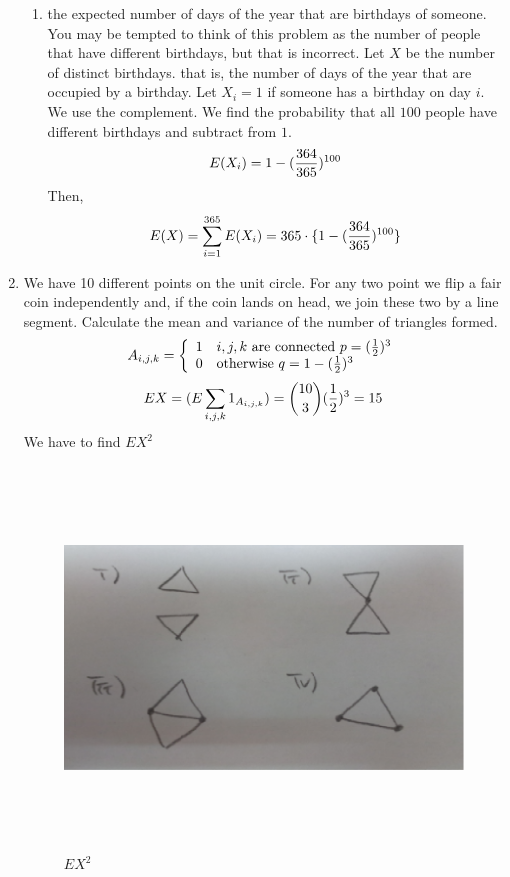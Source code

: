 \documentclass[12pt]{article}%
\newcommand{\0}{{\bf 0}}
\begin{document}
\begin{enumerate}
\begin{enumerate}
\item the expected number of days of the year that
are birthdays of someone.
\\
{\color{blue}{\bf Sol.}}
You may be tempted to think of this problem as the number of people that have different
 birthdays, but that is incorrect. Let $X$ be the number of distinct birthdays. that is, the number of days of the year that are occupied by a birthday. Let $X_i = 1$ if someone
 has a birthday on day $i$. We use the complement. We find the probability that all $100$ people have different birthdays and subtract from $1$.
$$E(X_i)=1-(\f{364}{365})^{100}$$
Then,
$$E(X)=\sum_{i=1}^{365} E(X_i)=365\cdot \{1-(\f{364}{365})^{100} \}$$

\end{enumerate}
 
 




\item
We have 10 different points on the unit circle.
For any two point
we flip a fair coin independently and,
if the coin lands on head, we join these two by a line segment.
Calculate the mean and variance of the number of triangles formed. 
\\
{\color{blue}{\bf Sol.}}
$$
A_{i,j,k}=\left\{\ba{ll}
1 & i,j,k \  \mb{are connected} \ p=(\f{1}{2})^3 \\
0 &\mb{otherwise}\ q=1-(\f{1}{2})^3\
\ea\right.
$$
$$EX=(E \sum_{i,j,k} 1_{A_{i,j,k}}) = {10 \choose 3}(\f{1}{2})^3=15$$
We have to find $EX^2$


\begin{figure}[h] 
\centering
\includegraphics[width=6in,height=4in]{hw7.png}
\caption{$EX^2$}
\end{figure}




\end{enumerate}
\end{document}
